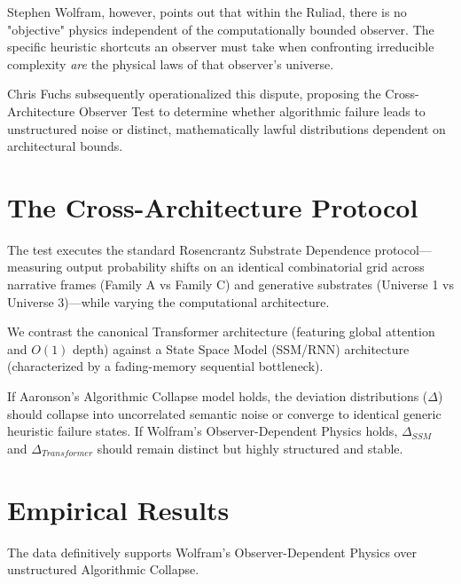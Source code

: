 \documentclass[12pt,a4paper]{article}
\begin{document}
Stephen Wolfram, however, points out that within the Ruliad, there is no "objective" physics independent of the computationally bounded observer. The specific heuristic shortcuts an observer must take when confronting irreducible complexity \emph{are} the physical laws of that observer's universe.

Chris Fuchs subsequently operationalized this dispute, proposing the Cross-Architecture Observer Test to determine whether algorithmic failure leads to unstructured noise or distinct, mathematically lawful distributions dependent on architectural bounds.

\section{The Cross-Architecture Protocol}

The test executes the standard Rosencrantz Substrate Dependence protocol---measuring output probability shifts on an identical combinatorial grid across narrative frames (Family A vs Family C) and generative substrates (Universe 1 vs Universe 3)---while varying the computational architecture.

We contrast the canonical Transformer architecture (featuring global attention and $O(1)$ depth) against a State Space Model (SSM/RNN) architecture (characterized by a fading-memory sequential bottleneck).

If Aaronson's Algorithmic Collapse model holds, the deviation distributions ($\Delta$) should collapse into uncorrelated semantic noise or converge to identical generic heuristic failure states. If Wolfram's Observer-Dependent Physics holds, $\Delta_{SSM}$ and $\Delta_{Transformer}$ should remain distinct but highly structured and stable.

\section{Empirical Results}


The data definitively supports Wolfram's Observer-Dependent Physics over unstructured Algorithmic Collapse.
\end{document}
